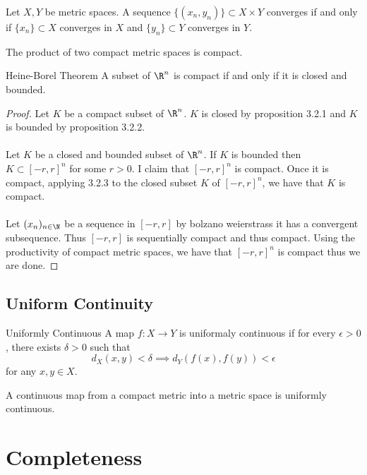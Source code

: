\begin{lmm}{}{} Let $X,Y$ be metric spaces. A sequence $\{(x_n,y_n)\}\subset X\times Y$ converges if and only if $\{x_n\}\subset X$ converges in $X$ and $\{y_n\}\subset Y$ converges in $Y$. 
\end{lmm}

\begin{prp}{}{} The product of two compact metric spaces is compact. 
\end{prp}

\begin{thm}{Heine-Borel Theorem}{} A subset of $\R^n$ is compact if and only if it is closed and bounded. \tcbline
\begin{proof}
Let $K$ be a compact subset of $\R^n$. $K$ is closed by proposition 3.2.1 and $K$ is bounded by proposition 3.2.2. \\~\\
Let $K$ be a closed and bounded subset of $\R^n$. If $K$ is bounded then $K\subset[-r,r]^n$ for some $r>0$. I claim that $[-r,r]^n$ is compact. Once it is compact, applying 3.2.3 to the closed subset $K$ of $[-r,r]^n$, we have that $K$ is compact. \\~\\
Let $(x_n)_{n\in\N}$ be a sequence in $[-r,r]$ by bolzano weierstrass it has a convergent subsequence. Thus $[-r,r]$ is sequentially compact and thus compact. Using the productivity of compact metric spaces, we have that $[-r,r]^n$ is compact thus we are done. 
\end{proof}
\end{thm}

\subsection{Uniform Continuity}
\begin{defn}{Uniformly Continuous}{} A map $f:X\to Y$ is uniformaly continuous if for every $\epsilon>0$, there exists $\delta>0$ such that $$d_X(x,y)<\delta\implies d_Y(f(x),f(y))<\epsilon$$ for any $x,y\in X$. 
\end{defn}

\begin{thm}{}{} A continuous map from a compact metric into a metric space is uniformly continuous. 
\end{thm}

\pagebreak
\section{Completeness}
